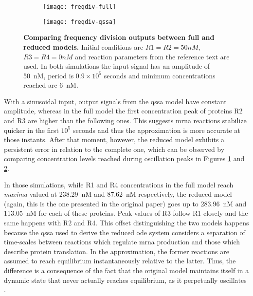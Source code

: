     \begin{figure}[!htb]
      \centering
      \begin{subfigure}[t]{0.45\textwidth}
        \centering
        \texttt{[image: freqdiv-full]}
        \caption{}
        \label{fig.freqdiv-full}
      \end{subfigure}
      \hspace{1em}
      \begin{subfigure}[t]{0.45\textwidth}
        \centering
        \texttt{[image: freqdiv-qssa]}
        \caption{}
        \label{fig.freqdiv-qssa}
      \end{subfigure}
      \caption{\textbf{Comparing frequency division outputs between full and reduced models.} Initial conditions are $R1 = R2 = 50nM$, $R3 = R4 = 0nM$ and reaction parameters from the reference text are used. In both simulations the input signal has an amplitude of \SI{50}{\nano M}, period is $0.9 \times 10^5$ seconds and minimum concentrations reached are \SI{6}{\nano M}.}
      \label{fig.freqdiv-sinusoidal}
    \end{figure}

    With a sinusoidal input, output signals from the \ac{qssa} model have constant amplitude, whereas in the full model the first concentration peak of proteins R2 and R3 are higher than the following ones.
    This suggests \acs{mrna} reactions stabilize quicker in the first $10^5$ seconds and thus the approximation is more accurate at those instants.
    After that moment, however, the reduced model exhibits a persistent error in relation to the complete one, which can be observed by comparing concentration levels reached during oscillation peaks in Figures \ref{fig.freqdiv-full} and \ref{fig.freqdiv-qssa}.

    In those simulations, while R1 and R4 concentrations in the full model reach \textit{maxima} valued at \SI{238.29}{\nano M} and \SI{87.62}{\nano M} respectively, the reduced model (again, this is the one presented in the original paper) goes up to \SI{283.96}{\nano M} and \SI{113.05}{\nano M} for each of these proteins.
    Peak values of R3 follow R1 closely and the same happens with R2 and R4.
    This offset distinguishing the two models happens because the \ac{qssa} used to derive the reduced \ac{ode} system considers a separation of time-scales between reactions which regulate \acs{mrna} production and those which describe protein translation.
    In the approximation, the former reactions are assumed to reach equilibrium instantaneously relative to the latter.
    Thus, the difference is a consequence of the fact that the original model maintains itself in a dynamic state that never actually reaches equilibrium, as it perpetually oscillates \cite{ingalls}.

